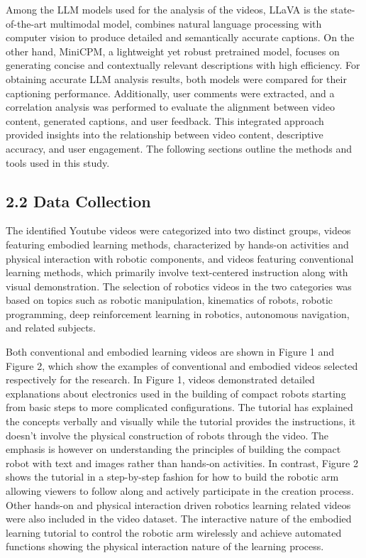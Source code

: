 \documentclass[12pt]{article}
\begin{document}
Among the LLM models used for the analysis of the videos, LLaVA is the state-of-the-art multimodal model, combines natural language processing with computer vision to produce detailed and semantically accurate captions. On the other hand, MiniCPM, a lightweight yet robust pretrained model, focuses on generating concise and contextually relevant descriptions with high efficiency. For obtaining accurate LLM analysis results, both models were compared for their captioning performance. Additionally, user comments were extracted, and a correlation analysis was performed to evaluate the alignment between video content, generated captions, and user feedback. This integrated approach provided insights into the relationship between video content, descriptive accuracy, and user engagement. The following sections outline the methods and tools used in this study.



\subsection*{2.2 Data Collection}

The identified Youtube videos were categorized into two distinct groups, videos featuring embodied learning methods, characterized by hands-on activities and physical interaction with robotic components, and videos featuring conventional learning methods, which primarily involve text-centered instruction along with visual demonstration. The selection of robotics videos in the two categories was based on topics such as robotic manipulation, kinematics of robots, robotic programming, deep reinforcement learning in robotics, autonomous navigation, and related subjects.

Both conventional and embodied learning videos are shown in Figure 1 and Figure 2, which show the examples of conventional and embodied videos selected respectively for the research. In Figure 1, videos demonstrated detailed explanations about electronics used in the building of compact robots starting from basic steps to more complicated configurations. The tutorial has explained the concepts verbally and visually while the tutorial provides the instructions, it doesn’t involve the physical construction of robots through the video. The emphasis is however on understanding the principles of building the compact robot with text and images rather than hands-on activities. In contrast, Figure 2 shows the tutorial in a step-by-step fashion for how to build the robotic arm allowing viewers to follow along and actively participate in the creation process. Other hands-on and physical interaction driven robotics learning related videos were also included in the video dataset. The interactive nature of the embodied learning tutorial to control the robotic arm wirelessly and achieve automated functions showing the physical interaction nature of the learning process. 
\end{document}

